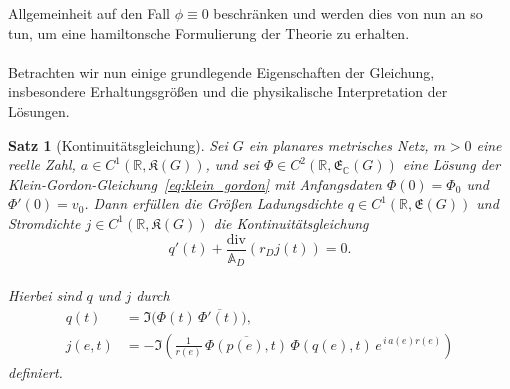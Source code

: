 \documentclass[11pt,a4paper,leqno]{report}
\newtheorem{proposition}{Satz}[chapter]
\numberwithin{equation}{chapter}
\begin{document}
Allgemeinheit auf den Fall \(\phi \equiv 0\) beschränken und werden dies von nun an 
so tun, um eine hamiltonsche Formulierung der Theorie zu erhalten.\\
\\
Betrachten wir nun einige grundlegende Eigenschaften der Gleichung, insbesondere 
Erhaltungsgrößen und die physikalische Interpretation der Lösungen.
\begin{proposition}[Kontinuitätsgleichung]\label{prop:kontinuitaet}
	Sei $G$ ein planares metrisches Netz, $m > 0$ eine reelle Zahl, 
	$a \in C^1(\mathbb{R}, \mathfrak{K}(G))$, 
	und sei $\Phi \in C^2(\mathbb{R}, \mathfrak{E}_\mathbb{C}(G))$ 
	eine Lösung der Klein-Gordon-Gleichung~\eqref{eq:klein_gordon} 
	mit Anfangsdaten \(\Phi(0)=\Phi_0\) und \(\Phi'(0)=v_0\).
	Dann erfüllen die Größen 
	\emph{Ladungsdichte} $q \in C^1(\mathbb{R}, \mathfrak{E}(G))$ 
	und \emph{Stromdichte} $j \in C^1(\mathbb{R}, \mathfrak{K}(G))$ die Kontinuitätsgleichung
	\begin{equation}\label{eq:kg_kontinuitaet}
		q'(t) + \frac{\mathrm{div}}{\mathbb{A}_D}(r_Dj(t)) = 0.
	\end{equation}
	\\
	Hierbei sind $q$ und $j$ durch
	\begin{align}
		q(t) &= \Im\!\bigl(\Phi(t)\,\overline{\Phi'(t)}\bigr), \label{eq:kg_qdef}\\[4pt]
		j(e,t) &= -\Im\!\left(
		\frac{1}{r(e)}\,
		\overline{\Phi(p(e),t)}\,
		\Phi(q(e),t)\,
		e^{\,i\,a(e)r(e)}
		\right) \label{eq:kg_jedge}
	\end{align}
	definiert.
\end{proposition}
\noindent
\end{document}
